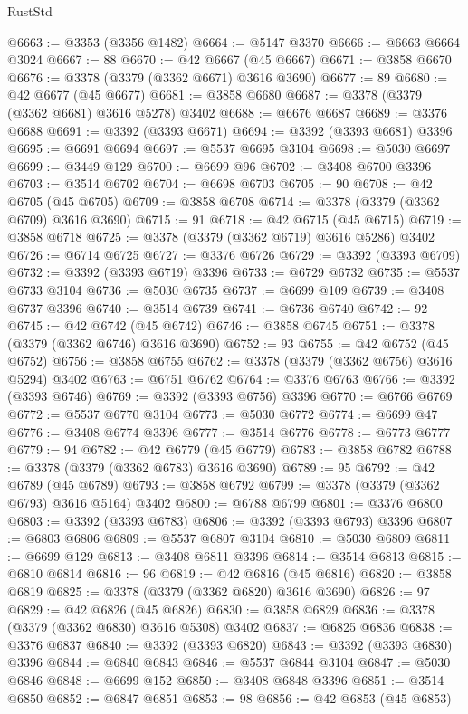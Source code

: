 \begin{lexlean}{RustStd}
\begin{coremodule}
@6663 := @3353 (@3356 @1482)
@6664 := @5147 @3370
@6666 := @6663 @6664 @3024
@6667 := 88
@6670 := @42 @6667 (@45 @6667)
@6671 := @3858 @6670
@6676 := @3378 (@3379 (@3362 @6671) @3616 @3690)
@6677 := 89
@6680 := @42 @6677 (@45 @6677)
@6681 := @3858 @6680
@6687 := @3378 (@3379 (@3362 @6681) @3616 @5278) @3402
@6688 := @6676 @6687
@6689 := @3376 @6688
@6691 := @3392 (@3393 @6671)
@6694 := @3392 (@3393 @6681) @3396
@6695 := @6691 @6694
@6697 := @5537 @6695 @3104
@6698 := @5030 @6697
@6699 := @3449 @129
@6700 := @6699 @96
@6702 := @3408 @6700 @3396
@6703 := @3514 @6702
@6704 := @6698 @6703
@6705 := 90
@6708 := @42 @6705 (@45 @6705)
@6709 := @3858 @6708
@6714 := @3378 (@3379 (@3362 @6709) @3616 @3690)
@6715 := 91
@6718 := @42 @6715 (@45 @6715)
@6719 := @3858 @6718
@6725 := @3378 (@3379 (@3362 @6719) @3616 @5286) @3402
@6726 := @6714 @6725
@6727 := @3376 @6726
@6729 := @3392 (@3393 @6709)
@6732 := @3392 (@3393 @6719) @3396
@6733 := @6729 @6732
@6735 := @5537 @6733 @3104
@6736 := @5030 @6735
@6737 := @6699 @109
@6739 := @3408 @6737 @3396
@6740 := @3514 @6739
@6741 := @6736 @6740
@6742 := 92
@6745 := @42 @6742 (@45 @6742)
@6746 := @3858 @6745
@6751 := @3378 (@3379 (@3362 @6746) @3616 @3690)
@6752 := 93
@6755 := @42 @6752 (@45 @6752)
@6756 := @3858 @6755
@6762 := @3378 (@3379 (@3362 @6756) @3616 @5294) @3402
@6763 := @6751 @6762
@6764 := @3376 @6763
@6766 := @3392 (@3393 @6746)
@6769 := @3392 (@3393 @6756) @3396
@6770 := @6766 @6769
@6772 := @5537 @6770 @3104
@6773 := @5030 @6772
@6774 := @6699 @47
@6776 := @3408 @6774 @3396
@6777 := @3514 @6776
@6778 := @6773 @6777
@6779 := 94
@6782 := @42 @6779 (@45 @6779)
@6783 := @3858 @6782
@6788 := @3378 (@3379 (@3362 @6783) @3616 @3690)
@6789 := 95
@6792 := @42 @6789 (@45 @6789)
@6793 := @3858 @6792
@6799 := @3378 (@3379 (@3362 @6793) @3616 @5164) @3402
@6800 := @6788 @6799
@6801 := @3376 @6800
@6803 := @3392 (@3393 @6783)
@6806 := @3392 (@3393 @6793) @3396
@6807 := @6803 @6806
@6809 := @5537 @6807 @3104
@6810 := @5030 @6809
@6811 := @6699 @129
@6813 := @3408 @6811 @3396
@6814 := @3514 @6813
@6815 := @6810 @6814
@6816 := 96
@6819 := @42 @6816 (@45 @6816)
@6820 := @3858 @6819
@6825 := @3378 (@3379 (@3362 @6820) @3616 @3690)
@6826 := 97
@6829 := @42 @6826 (@45 @6826)
@6830 := @3858 @6829
@6836 := @3378 (@3379 (@3362 @6830) @3616 @5308) @3402
@6837 := @6825 @6836
@6838 := @3376 @6837
@6840 := @3392 (@3393 @6820)
@6843 := @3392 (@3393 @6830) @3396
@6844 := @6840 @6843
@6846 := @5537 @6844 @3104
@6847 := @5030 @6846
@6848 := @6699 @152
@6850 := @3408 @6848 @3396
@6851 := @3514 @6850
@6852 := @6847 @6851
@6853 := 98
@6856 := @42 @6853 (@45 @6853)

\end{coremodule}
\end{lexlean}
